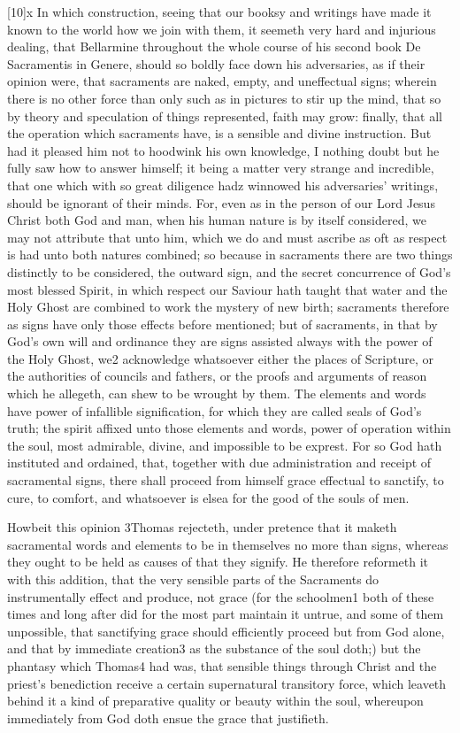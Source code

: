 [10]x In which construction, seeing that our booksy and writings have made it known to the world how we join with them, it seemeth very hard and injurious dealing, that Bellarmine throughout the whole course of his second book De Sacramentis in Genere, should so boldly face down his adversaries, as if their opinion were, that sacraments are naked, empty, and uneffectual signs; wherein there is no other force than only such as in pictures to stir up the mind, that so by theory and speculation of things represented, faith may grow: finally, that all the operation which sacraments  have, is a sensible and divine instruction. But had it pleased him not to hoodwink his own knowledge, I nothing doubt but he fully saw how to answer himself; it being a matter very strange and incredible, that one which with so great diligence hadz winnowed his adversaries’ writings, should be ignorant of their minds. For, even as in the person of our Lord Jesus Christ both God and man, when his human nature is by itself considered, we may not attribute that unto him, which we do and must ascribe as oft as respect is had unto both natures combined; so because in sacraments there are two things distinctly to be considered, the outward sign, and the secret concurrence of God’s most blessed Spirit, in which respect our Saviour hath taught that water and the Holy Ghost are combined to work the mystery of new birth; sacraments therefore as signs have only those effects before mentioned; but of sacraments, in that by God’s own will and ordinance they are signs assisted always with the power of the Holy Ghost, we2 acknowledge whatsoever either the places of Scripture, or the authorities of councils and fathers, or the proofs and arguments of reason which he allegeth, can shew to be wrought by them. The elements and words have power of infallible signification, for which they are called seals of God’s truth; the spirit affixed unto those elements and words, power of operation within the soul, most admirable, divine, and impossible to be exprest. For so God hath instituted and ordained, that, together with due administration and receipt of sacramental signs, there shall proceed from himself grace effectual to sanctify, to cure, to comfort, and whatsoever is elsea for the good of the souls of men.

Howbeit this opinion 3Thomas rejecteth, under pretence that it maketh sacramental words and elements to be in themselves no more than signs, whereas they ought to be held as causes of that they signify. He therefore reformeth  it with this addition, that the very sensible parts of the Sacraments do instrumentally effect and produce, not grace (for the schoolmen1 both of these times and long after did for the most part maintain it untrue, and some of them unpossible, that sanctifying grace should efficiently proceed but from God alone, and that by immediate creation3 as the substance of the soul doth;) but the phantasy which Thomas4 had was, that sensible things through Christ and the priest’s benediction receive a certain supernatural transitory force, which leaveth behind it a kind of preparative quality or beauty within the soul, whereupon immediately from God doth ensue the grace that justifieth.

